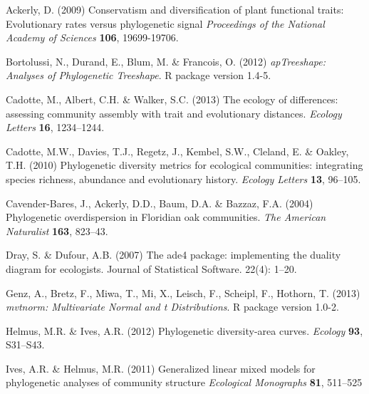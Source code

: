 \documentclass{bioinfo}
\begin{document}
\begin{thebibliography}{30}
\providecommand{\natexlab}[1]{#1}
\providecommand{\url}[1]{\texttt{#1}}
\providecommand{\urlprefix}{URL }

 Ackerly, D. (2009) Conservatism
  and diversification of plant functional traits: Evolutionary rates
  versus phylogenetic signal \emph{Proceedings of the National Academy
    of Sciences} \textbf{106}, 19699-19706.

 Bortolussi, N., Durand, E., Blum, M. \&
  Francois, O. (2012) \emph{apTreeshape: Analyses of Phylogenetic
    Treeshape}. R package version 1.4-5. 

Cadotte, M., Albert, C.H. \& Walker, S.C. (2013) The ecology of differences:
  assessing community assembly with trait and evolutionary distances.
  \emph{Ecology Letters} \textbf{16}, 1234--1244.

Cadotte, M.W., Davies, T.J., Regetz, J., Kembel, S.W., Cleland, E. \& Oakley,
  T.H. (2010) Phylogenetic diversity metrics for ecological communities:
  integrating species richness, abundance and evolutionary history.
  \emph{Ecology Letters} \textbf{13}, 96--105.

  Cavender-Bares, J., Ackerly, D.D., Baum, D.A. \& Bazzaz, F.A. (2004)
  {Phylogenetic overdispersion in Floridian oak
    communities}. \emph{The American Naturalist} \textbf{163},
  823--43.

 Dray, S. \&
  Dufour, A.B. (2007) The ade4 package: implementing the duality
  diagram for ecologists. Journal of Statistical Software. 22(4):
  1--20.

 Genz, A., Bretz, F.,
  Miwa, T., Mi, X., Leisch, F., Scheipl, F., Hothorn, T. (2013)
  \emph{mvtnorm: Multivariate Normal and t
    Distributions}. R package version 1.0-2.

Helmus, M.R. \& Ives, A.R. (2012) Phylogenetic diversity-area curves.
  \emph{Ecology} \textbf{93}, S31--S43.

Ives, A.R. \&
  Helmus, M.R. (2011) Generalized linear mixed models for phylogenetic
  analyses of community structure \emph{Ecological Monographs}
  \textbf{81}, 511--525


\end{thebibliography}
\end{document}
